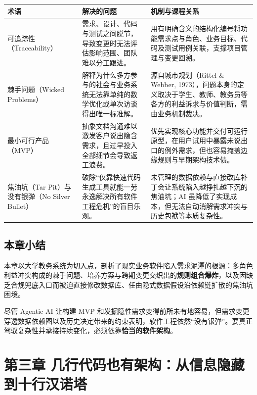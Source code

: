 \documentclass[UTF8,a4paper,11pt,fontset=fandol]{ctexart}
\begin{document}
\begin{center}\small\begin{tabularx}{\linewidth}{YYY}

\toprule

术语 & 解决的问题 & 机制与课程关系\\\midrule

可追踪性（Traceability） & 需求、设计、代码与测试之间脱节，导致变更时无法评估影响范围、团队难以分工跟进。 & 用有明确含义的结构化编号将功能需求点与角色、业务目标、代码及测试用例关联，支撑项目管理与变更回溯。\\[3pt]

棘手问题（Wicked Problems） & 解释为什么多方参与的社会与业务系统无法靠单纯的数学优化或单次访谈得出唯一标准解。 & 源自城市规划（Rittel \& Webber, 1973），问题本身的定义取决于学生、教师、教务员等各方的利益诉求与价值判断，需由业务机制裁决。\\[3pt]

最小可行产品（MVP） & 抽象文档沟通难以激发客户说出隐含需求，且过早投入全部细节会导致返工浪费。 & 优先实现核心功能并交付可运行原型，在用户试用中暴露未说出口的例外需求，但也容易掩盖边缘规则与早期架构技术债。\\[3pt]

焦油坑（Tar Pit）与没有银弹（No Silver Bullet） & 破除“仅靠快速代码生成工具就能一劳永逸解决所有软件工程危机”的盲目乐观。 & 未管理的数据依赖与直接改库补丁会让系统陷入越挣扎越下沉的焦油坑；AI 虽降低了实现成本，但无法自动消解需求冲突与历史包袱等本质复杂性。\\[3pt]

\bottomrule\end{tabularx}\end{center}

\subsection{本章小结}

本章以大学教务系统为切入点，剖析了现实业务软件陷入需求泥潭的根源：多角色利益冲突构成的棘手问题、培养方案与跨期变更交织出的\textbf{规则组合爆炸}，以及因缺乏合规兜底入口而被迫直接修改数据库、任由隐式数据假设沿依赖链扩散的焦油坑困境。

尽管 Agentic AI 让构建 MVP 和发掘隐性需求变得前所未有地容易，但需求变更穿透数据依赖图以及历史决定带来的约束表明，软件工程依然“没有银弹”。要真正驾驭复杂性并承接持续变化，必须依靠\textbf{恰当的软件架构}。

\section{第三章 几行代码也有架构：从信息隐藏到十行汉诺塔}
\end{document}
